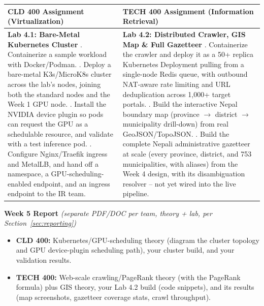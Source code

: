 \documentclass[10pt, a4paper]{article}
\newcommand{\weeklyreport}[3]{%
  \par\vspace{0.4em}
  \noindent\colorbox{lightgray!35}{\parbox{\dimexpr\textwidth-2\fboxsep\relax}{%
    \textbf{\color{primary}#1 Report} \textit{(separate PDF/DOC per team, theory + lab, per Section~\ref{sec:reporting})}
    \begin{itemize}
        \item \textbf{CLD 400:} #2
        \item \textbf{TECH 400:} #3
    \end{itemize}
  }}%
  \par\vspace{0.3em}
}
\begin{document}
\begin{table}[H]
\centering
\small
\renewcommand{\arraystretch}{1.2}
\begin{tabularx}{\textwidth}{|X|X|}
\hline
\rowcolor{lightgray}
\textbf{CLD 400 Assignment (Virtualization)} & \textbf{TECH 400 Assignment (Information Retrieval)} \\ \hline
\textbf{Lab 4.1: Bare-Metal Kubernetes Cluster} \newline
1. Containerize a sample workload with Docker/Podman. \newline
2. Deploy a bare-metal K3s/MicroK8s cluster across the lab's nodes, joining both the standard nodes and the Week 1 GPU node. \newline
3. Install the NVIDIA device plugin so pods can request the GPU as a schedulable resource, and validate with a test inference pod. \newline
4. Configure Nginx/Traefik ingress and MetalLB, and hand off a namespace, a GPU-scheduling-enabled endpoint, and an ingress endpoint to the IR team. & \textbf{Lab 4.2: Distributed Crawler, GIS Map \& Full Gazetteer} \newline
1. Containerize the crawler and deploy it as a 50+ replica Kubernetes Deployment pulling from a single-node Redis queue, with outbound NAT-aware rate limiting and URL deduplication across 1,000+ target portals. \newline
2. Build the interactive Nepal boundary map (province $\to$ district $\to$ municipality drill-down) from real GeoJSON/TopoJSON. \newline
3. Build the complete Nepali administrative gazetteer at scale (every province, district, and 753 municipalities, with aliases) from the Week 4 design, with its disambiguation resolver -- not yet wired into the live pipeline. \\ \hline
\end{tabularx}
\end{table}

\weeklyreport{Week 5}{Kubernetes/GPU-scheduling theory (diagram the cluster topology and GPU device-plugin scheduling path), your cluster build, and your validation results.}{Web-scale crawling/PageRank theory (with the PageRank formula) plus GIS theory, your Lab 4.2 build (code snippets), and its results (map screenshots, gazetteer coverage stats, crawl throughput).}

\vspace{0.5em}

\end{document}
